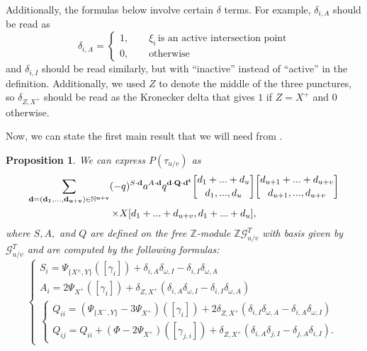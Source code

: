 \documentclass[11pt]{amsart}
\theoremstyle{plain}
\newtheorem{propositionN}[theoremN]{Proposition}
\theoremstyle{definition}
\theoremstyle{remark}
\begin{document}
Additionally, the formulas below involve certain $\delta$ terms. For example, $\delta_{i,A}$ should be read as
\[
\delta_{i,A}=
\begin{cases}
    1, \qquad \xi_i \,\text{is an active intersection point}\\
    0, \qquad \text{otherwise}
\end{cases}
\]
and $\delta_{i,I}$ should be read similarly, but with ``inactive'' instead of ``active'' in the definition. Additionally, we used $Z$ to denote the middle of the three punctures, so $\delta_{Z,X^+}$ should be read as the Kronecker delta that gives $1$ if $Z=X^+$ and $0$ otherwise.

Now, we can state the first main result that we will need from \cite{JHpI26}.

\begin{propositionN}
\label{tangleHOMFLYpoly}
    We can express $P(\tau_{u/v})$ as
    \begin{multline}
    \label{HOMFLYthmeq}
        \sum_{\bf{d}=(d_1,...,d_{u+v})\in \mathbb{N}^{u+v}}(-q)^{S\cdot\bf{d}}a^{A\cdot \bf{d}}q^{\bf{d}\cdot Q\cdot \bf{d}^t}{d_1+...+d_u\brack d_1,...,d_u}{d_{u+1}+...+d_{u+v}\brack d_{u+1},...,d_{u+v}}\\ \times X[d_1+...+d_{u+v},d_1+...+d_u],
    \end{multline}
    where $S,A,$ and $Q$ are defined on the free $\mathbb{Z}$-module $\mathbb{Z}\mathcal{G}_{u/v}^T$ with basis given by $\mathcal{G}_{u/v}^T$ and are computed by the following formulas:
    \newline
    \[
    \begin{cases}
        S_i=\Psi_{\{X^\pm,Y\}}([\gamma_i])+\delta_{i,A}\delta_{\omega,I}-\delta_{i,I}\delta_{\omega,A}\\
        A_i=2\Psi_{X^+}([\gamma_i])+\delta_{Z,X^+}(\delta_{i,A}\delta_{\omega,I}-\delta_{i,I}\delta_{\omega,A})\\
        \begin{cases}
            Q_{ii}=(\Psi_{\{X^-,Y\}}-3\Psi_{X^+})([\gamma_i])+2\delta_{Z,X^+}(\delta_{i,I}\delta_{\omega,A}-\delta_{i,A}\delta_{\omega,I})\\
            Q_{ij}=Q_{ii}+(\Phi-2\Psi_{X^+})([\gamma_{j,i}])+\delta_{Z,X^+}(\delta_{i,A}\delta_{j,I}-\delta_{j,A}\delta_{i,I}).
        \end{cases}
    \end{cases}
    \]
\end{propositionN}
\end{document}
